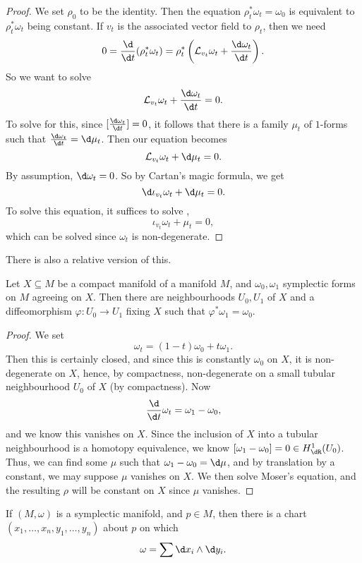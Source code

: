 \documentclass[a4paper]{article}
\begin{document}
\begin{proof}
  We set $\rho_0$ to be the identity. Then the equation $\rho_t^* \omega_t = \omega_0$ is equivalent to $\rho_t^* \omega_t$ being constant. If $v_t$ is the associated vector field to $\rho_t$, then we need
  \[
    0 = \frac{\d}{\d t}(\rho_t^* \omega_t) = \rho_t^* \left(\mathcal{L}_{v_t} \omega_t + \frac{\d \omega_t}{\d t}\right).
  \]
  So we want to solve
  \[
    \mathcal{L}_{v_t} \omega_t + \frac{\d \omega_t}{\d t} = 0.
  \]
  To solve for this, since $[\frac{\d \omega_t}{\d t}] = 0$, it follows that there is a family $\mu_t$ of $1$-forms such that $\frac{\d \omega_t}{\d t} = \d \mu_t$. Then our equation becomes
  \[
    \mathcal{L}_{v_t} \omega_t + \d \mu_t = 0.
  \]
  By assumption, $\d \omega_t = 0$. So by Cartan's magic formula, we get
  \[
    \d \iota_{v_t} \omega_t + \d \mu_t = 0.
  \]
  To solve this equation, it suffices to solve ,
  \[
    \iota_{v_t} \omega_t + \mu_t = 0,
  \]
  which can be solved since $\omega_t$ is non-degenerate.
\end{proof}

There is also a relative version of this.
\begin{thm}
  Let $X \subseteq M$ be a compact manifold of a manifold $M$, and $\omega_0, \omega_1$ symplectic forms on $M$ agreeing on $X$. Then there are neighbourhoods $U_0, U_1$ of $X$ and a diffeomorphism $\varphi: U_0 \to U_1$ fixing $X$ such that $\varphi^* \omega_1 = \omega_0$.
\end{thm}

\begin{proof}
  We set
  \[
    \omega_t = (1 - t) \omega_0 + t \omega_1.
  \]
  Then this is certainly closed, and since this is constantly $\omega_0$ on $X$, it is non-degenerate on $X$, hence, by compactness, non-degenerate on a small tubular neighbourhood $U_0$ of $X$ (by compactness). Now
  \[
    \frac{\d}{\d t} \omega_t = \omega_1 - \omega_0,
  \]
  and we know this vanishes on $X$. Since the inclusion of $X$ into a tubular neighbourhood is a homotopy equivalence, we know $[\omega_1 - \omega_0] = 0 \in H^1_{\dR}(U_0)$. Thus, we can find some $\mu$ such that $\omega_1 - \omega_0 = \d \mu$, and by translation by a constant, we may suppose $\mu$ vanishes on $X$. We then solve Moser's equation, and the resulting $\rho$ will be constant on $X$ since $\mu$ vanishes.
\end{proof}
\begin{thm}
  If $(M, \omega)$ is a symplectic manifold, and $p \in M$, then there is a chart $(x_1, \ldots, x_n, y_1, \ldots, y_n)$ about $p$ on which
  \[
    \omega = \sum \d x_i \wedge \d y_i.
  \]
\end{thm}
\end{document}
